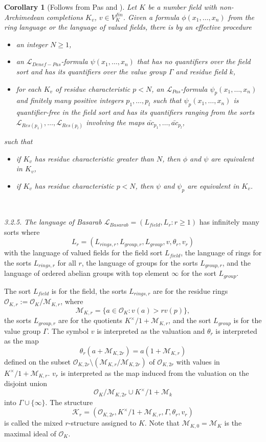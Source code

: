 \documentclass[12pt]{amsart}
\def\cL{\mathcal{L}}
\def\cL{\mathcal{L}}
\newtheorem{cor}{Corollary}[section]
\numberwithin{equation}{section}
\begin{document}
\begin{cor}[Follows from Pas \cite{pas} and \cite{pas2}]\label{pas} Let $K$ be a number field with non-Archimedean  completions $K_v$, $v\in V_K^{fin}$. 
Given a formula $\phi(x_1,\dots,x_n)$ from the ring language or the language of valued fields, there is by an effective procedure
\begin{itemize}
\item an integer $N\geq 1$,
\item an $\cL_{Denef-Pas}$-formula $\psi(x_1,\dots,x_n)$ that has no quantifiers over the field sort and has its quantifiers over the value group $\Gamma$ and residue field $k$,
\item for each $K_v$ of residue characteristic $p<N$, an $\cL_{Pas}$-formula $\psi_p(x_1,\dots,x_n)$ and finitely many positive integers $p_1,\dots,p_l$ 
such that $\psi_p(x_1,\dots,x_n)$ is quantifier-free in the field sort and has its quantifiers ranging from the sorts $\cL_{Res(p_1)},\dots,\cL_{Res(p_l)}$ involving 
the maps $\bar{ac}_{p_1},\dots,\bar{ac}_{p_l}$,
\end{itemize}
such that
\begin{itemize}
\item if $K_v$ has residue characteristic greater than $N$, then $\phi$ and $\psi$ are equivalent in $K_v$,
\item if $K_v$ has residue characteristic $p<N$, then $\psi$ and $\psi_p$ are equivalent in $K_v$.
\end{itemize}
\end{cor}
 
\

{\it 3.2.5. The language of Basarab \cite{basarab}} $\cL_{Basarab}=(L_{field},L_r: r\geq 1)$ has infinitely many sorts 
where
$$L_r=(L_{rings,r},L_{group,r},L_{group},v,\theta_r,v_r)$$
with the language of valued fields for the field sort $L_{field}$, the language of rings for the sorts $L_{rings,r}$ for all $r$, the language of groups for the sorts $L_{group,r}$, and the language of ordered abelian groups with top element $\infty$ for the sort $L_{group}$. 

The sort $L_{field}$ is for the field, the sorts $L_{rings,r}$ are for the residue rings $\mathcal{O}_{K,r}:=\mathcal{O}_K/\mathcal{M}_{K,r}$, where 
$$\mathcal{M}_{K,r}=\{a\in \mathcal{O}_K: v(a)>rv(p)\},$$ the sorts $L_{group,r}$ are for the quotients $K^{\times}/1+\mathcal{M}_{K,r}$, and the sort $L_{group}$ is for the value group $\Gamma$. The symbol $v$ is interpreted as the valuation and $\theta_r$ is interpreted as the map 
$$\theta_r(a+\mathcal{M}_{K,2r})=a(1+\mathcal{M}_{K,r})$$
defined on the subset 
$\mathcal{O}_{K,2r}\setminus (\mathcal{M}_{K,r}/\mathcal{M}_{K,2r})$ of $\mathcal{O}_{K,2r}$ with values in $K^{\times}/1+\mathcal{M}_{K,r}$. $v_r$ is interpreted as the map induced from the valuation on the disjoint union 
$$\mathcal{O}_{K}/\mathcal{M}_{K,2r} \cup K^{\times}/1+\mathcal{M}_{k}$$ into $\Gamma\cup \{\infty\}$. The structure 
$$\mathcal{K}_r=(\mathcal{O}_{K,2r},K^{\times}/1+\mathcal{M}_{K,r},\Gamma,\theta_r,v_r)$$
is called the mixed $r$-structure assigned to $K$. Note that $\mathcal{M}_{K,0}=\mathcal{M}_K$ is the maximal ideal of 
$\mathcal{O}_{K}$. 
\end{document}
